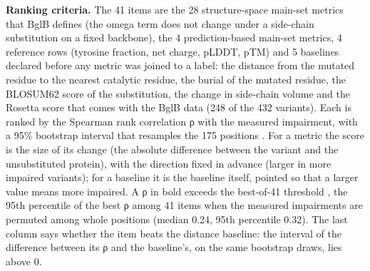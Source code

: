 \documentclass[
  10pt,
]{article}
\DeclareRobustCommand{\_}{\textunderscore\hspace{0pt}}
\begin{document}
\textbf{Ranking
criteria.} The 41
items are the 28
structure-space
main-set metrics
that BglB defines
(the omega term does
not change under a
side-chain
substitution on a
fixed backbone), the
4 prediction-based
main-set metrics, 4
reference rows
(tyrosine fraction,
net charge, pLDDT,
pTM) and 5 baselines
declared before any
metric was joined to
a label: the
distance from the
mutated residue to
the nearest
catalytic residue,
the burial of the
mutated residue, the
BLOSUM62 score of
the substitution,
the change in
side-chain volume
and the Rosetta
score that comes
with the BglB data
(248 of the 432
variants). Each is
ranked by the
Spearman rank
correlation ρ
\cite{spearman1904}
with the measured
impairment, with a
95\% bootstrap
interval that
resamples the 175
positions
\cite{field2007}.
For a metric the
score is the size of
its change (the
absolute difference
between the variant
and the
unsubstituted
protein), with the
direction fixed in
advance (larger in
more impaired
variants); for a
baseline it is the
baseline itself,
pointed so that a
larger value means
more impaired. A ρ
in bold exceeds the
best-of-41 threshold
\cite{westfall1993},
the 95th percentile
of the best ρ among
41 items when the
measured impairments
are permuted among
whole positions
(median 0.24, 95th
percentile 0.32).
The last column says
whether the item
beats the distance
baseline: the
interval of the
difference between
its ρ and the
baseline's, on the
same bootstrap
draws, lies above 0.
\end{document}
